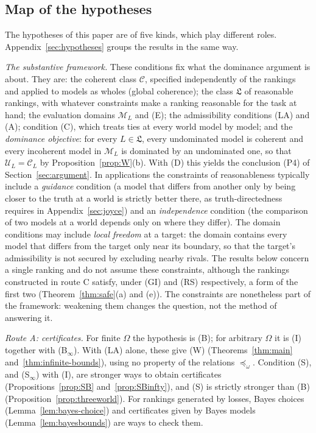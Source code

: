 \documentclass[11pt]{article}
\theoremstyle{definition}
\theoremstyle{remark}
\newcommand{\M}{\mathcal M}
\newcommand{\C}{\mathcal C}
\newcommand{\U}{\mathcal U}
\begin{document}
\subsection{Map of the hypotheses}\label{sec:map}
The hypotheses of this paper are of five kinds, which play different roles. Appendix~\ref{sec:hypotheses} groups the results in the same way.

\emph{The substantive framework.} These conditions fix what the dominance argument is about. They are: the coherent class $\C$, specified independently of the rankings and applied to models as wholes (global coherence); the class $\mathfrak L$ of reasonable rankings, with whatever constraints make a ranking reasonable for the task at hand; the evaluation domains $\M_L$ and (E); the admissibility conditions (LA) and (A); condition (C), which treats ties at every world model by model; and the \emph{dominance objective}: for every $L\in\mathfrak L$, every undominated model is coherent and every incoherent model in $\M_L$ is dominated by an undominated one, so that $\U_L=\C_L$ by Proposition~\ref{prop:W}(b). With (D) this yields the conclusion (P4) of Section~\ref{sec:argument}. In applications the constraints of reasonableness typically include a \emph{guidance} condition (a model that differs from another only by being closer to the truth at a world is strictly better there, as truth-directedness requires in Appendix~\ref{sec:joyce}) and an \emph{independence} condition (the comparison of two models at a world depends only on where they differ). The domain conditions may include \emph{local freedom} at a target: the domain contains every model that differs from the target only near its boundary, so that the target's admissibility is not secured by excluding nearby rivals. The results below concern a single ranking and do not assume these constraints, although the rankings constructed in route C satisfy, under (GI) and (RS) respectively, a form of the first two (Theorem~\ref{thm:safe}(a) and (e)). The constraints are nonetheless part of the framework: weakening them changes the question, not the method of answering it.

\emph{Route A: certificates.} For finite $\Omega$ the hypothesis is (B); for arbitrary $\Omega$ it is (I) together with (B$_\infty$). With (LA) alone, these give (W) (Theorems~\ref{thm:main} and~\ref{thm:infinite-bounds}), using no property of the relations $\preceq_\omega$. Condition (S), and (S$_\infty$) with (I), are stronger ways to obtain certificates (Propositions~\ref{prop:SB} and~\ref{prop:SBinfty}), and (S) is strictly stronger than (B) (Proposition~\ref{prop:threeworld}). For rankings generated by losses, Bayes choices (Lemma~\ref{lem:bayes-choice}) and certificates given by Bayes models (Lemma~\ref{lem:bayesbounds}) are ways to check them.
\end{document}
